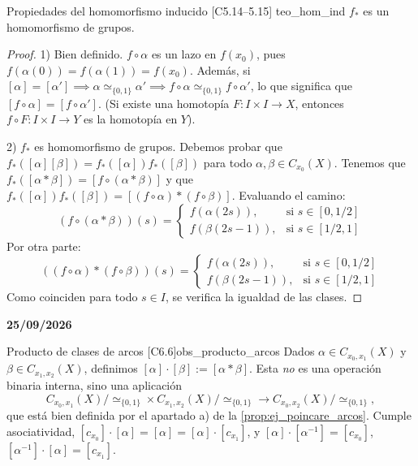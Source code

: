 \begin{teorema}{Propiedades del homomorfismo inducido [C5.14–5.15] \marcaT}{teo_hom_ind}
$f_*$ es un homomorfismo de grupos.
\end{teorema}

\begin{proof}
1) Bien definido. $f \circ \alpha$ es un lazo en $f(x_0)$, pues $f(\alpha(0)) = f(\alpha(1)) = f(x_0)$. Además, si $[\alpha] = [\alpha'] \implies \alpha \simeq_{\{0,1\}} \alpha' \implies f \circ \alpha \simeq_{\{0,1\}} f \circ \alpha'$, lo que significa que $[f \circ \alpha] = [f \circ \alpha']$.
(Si existe una homotopía $F: I \times I \to X$, entonces $f \circ F : I \times I \to Y$ es la homotopía en $Y$).

2) $f_*$ es homomorfismo de grupos. Debemos probar que $f_*([\alpha][\beta]) = f_*([\alpha]) f_*([\beta])$ para todo $\alpha, \beta \in C_{x_0}(X)$.
Tenemos que $f_*([\alpha * \beta]) = [f \circ (\alpha * \beta)]$ y que $f_*([\alpha])f_*([\beta]) = [(f \circ \alpha) * (f \circ \beta)]$. Evaluando el camino:
\[
(f \circ (\alpha * \beta))(s) = 
\begin{cases} 
f(\alpha(2s)), & \text{si } s \in [0, 1/2] \\ 
f(\beta(2s-1)), & \text{si } s \in [1/2, 1] 
\end{cases}
\]
Por otra parte:
\[
((f \circ \alpha) * (f \circ \beta))(s) = 
\begin{cases} 
f(\alpha(2s)), & \text{si } s \in [0, 1/2] \\ 
f(\beta(2s-1)), & \text{si } s \in [1/2, 1] 
\end{cases}
\]
Como coinciden para todo $s \in I$, se verifica la igualdad de las clases.
\end{proof}

\textbf{25/09/2026}

\begin{observacion}{Producto de clases de arcos [C6.6]}{obs_producto_arcos}
Dados $\alpha \in C_{x_0,x_1}(X)$ y $\beta \in C_{x_1,x_2}(X)$, definimos $[\alpha] \cdot [\beta] := [\alpha * \beta]$. Esta \emph{no} es una operación binaria interna, sino una aplicación
\[ C_{x_0,x_1}(X)/{\simeq_{\{0,1\}}} \times C_{x_1,x_2}(X)/{\simeq_{\{0,1\}}} \longrightarrow C_{x_0,x_2}(X)/{\simeq_{\{0,1\}}}, \]
que está bien definida por el apartado a) de la \cref{prop:ej_poincare_arcos}. Cumple asociatividad, $[c_{x_0}] \cdot [\alpha] = [\alpha] = [\alpha] \cdot [c_{x_1}]$, y $[\alpha] \cdot [\alpha^{-1}] = [c_{x_0}]$, $[\alpha^{-1}] \cdot [\alpha] = [c_{x_1}]$.
\end{observacion}

